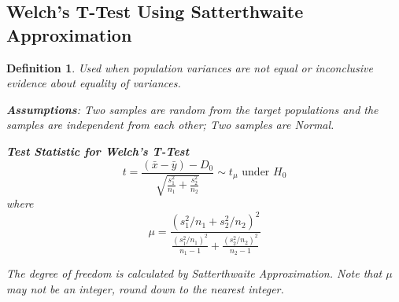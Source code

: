 \documentclass[a4paper,11pt]{article}
\newtheorem{defn}[thm]{Definition}
\begin{document}
\subsection{Welch's T-Test Using Satterthwaite Approximation}
\begin{defn}
\normalfont
Used when population variances are not equal or inconclusive evidence about equality of variances. 

\textbf{Assumptions}: Two samples are random from the target populations and the samples are independent from each other; Two samples are Normal. 

\textbf{Test Statistic for Welch's T-Test}
$$t=\frac{(\bar{x}-\bar{y})-D_0}{\sqrt{\frac{s_1^2}{n_1}+\frac{s_2^2}{n_2}}}\sim t_{\mu}\text{ under }H_0$$
where
$$\mu=\frac{(s_1^2/n_1+s_2^2/n_2)^2}{\frac{(s_1^2/n_1)^2}{n_1-1}+\frac{(s_2^2/n_2)^2}{n_2-1}}$$

The degree of freedom is calculated by Satterthwaite Approximation. Note that $\mu$ may not be an integer, {round down to the nearest integer}. 
\end{defn}
\newpage
\end{document}
